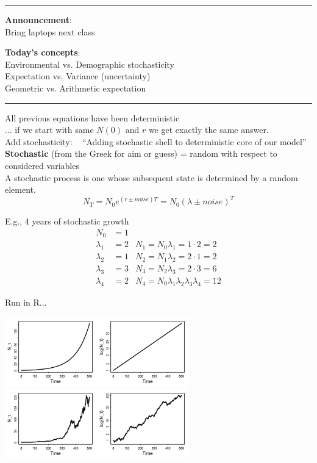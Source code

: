 \documentclass{article}
\newcommand{\note}[1]{\colorbox{gray!20}{#1}}
\begin{document}
\noindent{}

\rule[0.5ex]{\linewidth}{1pt}
\textbf{Announcement}: \\
Bring laptops next class

\textbf{Today's concepts}: \\
Environmental vs. Demographic stochasticity\\
Expectation vs. Variance (uncertainty)\\
Geometric vs. Arithmetic expectation

\rule[0.5ex]{\linewidth}{1pt}
All previous equations have been deterministic\\
... if we start with same $N(0)$ and $r$ we get exactly the same answer.\\
Add stochasticity:   ``Adding stochastic shell to deterministic core of our model''\\

\textbf{Stochastic} (from the Greek for aim or guess) = random with respect to considered variables\\
A stochastic process is one whose subsequent state is determined by a random element.
\begin{equation*}
	N_T = N_0 e^{(r\pm noise)T} = N_0 (\lambda \pm noise)^T
\end{equation*}

E.g., 4 years of stochastic growth
\begin{align*}
	N_0 &= 1 &\\
	\lambda_1 &= 2 & N_1 = N_0 \lambda_1 = 1\cdot 2 =  2\\
	\lambda_2 &= 1 & N_2 = N_1 \lambda_2 = 2\cdot 1 =  2\\
	\lambda_3 &= 3 & N_3 = N_2 \lambda_3 = 2\cdot 3 =  6\\
	\lambda_4 &= 2 & N_4 = N_0 \lambda_1 \lambda_2 \lambda_3 \lambda_4 =  12
\end{align*}

\note{Run in R...}
\begin{center}
\includegraphics[width=8cm]{figs/image}\\
\includegraphics[width=8cm]{figs/image0}
\end{center}
\end{document}
